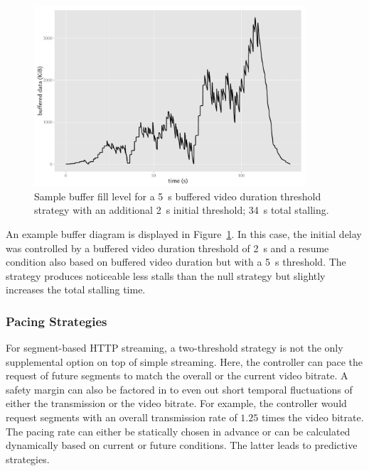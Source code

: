 \begin{figure}[htb]
	\centering
	\includegraphics[width=0.9\textwidth]{images/R-bufferlevel-flash.pdf}
	\caption{Sample buffer fill level for a \SI{5}{\second} buffered video duration threshold strategy with an additional \SI{2}{\second} initial threshold; \SI{34}{\second} total stalling.}
\label{c3:fig:bufferlevel-flash}
\end{figure}

An example buffer diagram is displayed in Figure~\ref{c3:fig:bufferlevel-flash}. In this case, the initial delay was controlled by a buffered video duration threshold of \SI{2}{\second} and a resume condition also based on buffered video duration but with a \SI{5}{\second} threshold. The strategy produces noticeable less stalls than the null strategy but slightly increases the total stalling time.


\subsubsection{Pacing Strategies}

For segment-based \gls{HTTP} streaming, a two-threshold strategy is not the only supplemental option on top of simple streaming. Here, the controller can pace the request of future segments to match the overall or the current video bitrate. A safety margin can also be factored in to even out short temporal fluctuations of either the transmission or the video bitrate. For example, the controller would request segments with an overall transmission rate of $1.25$ times the video bitrate. The pacing rate can either be statically chosen in advance or can be calculated dynamically based on current or future conditions. The latter leads to predictive strategies.


